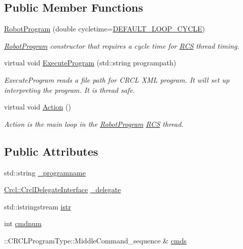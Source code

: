 \subsection*{Public Member Functions}
\begin{DoxyCompactItemize}
\item 
\hyperlink{classRCS_1_1RobotProgram_a9704d21c4a2d24fc856fad7af6e99903}{Robot\-Program} (double cycletime=\hyperlink{RCS_8h_a226eb3a426e9df46b88c4ba34f217203}{D\-E\-F\-A\-U\-L\-T\-\_\-\-L\-O\-O\-P\-\_\-\-C\-Y\-C\-L\-E})
\begin{DoxyCompactList}\small\item\em \hyperlink{classRCS_1_1RobotProgram}{Robot\-Program} constructor that requires a cycle time for \hyperlink{namespaceRCS}{R\-C\-S} thread timing. \end{DoxyCompactList}\item 
virtual void \hyperlink{classRCS_1_1RobotProgram_a0998f374dd54b6a0843d33a664c9da15}{Execute\-Program} (std\-::string programpath)
\begin{DoxyCompactList}\small\item\em Execute\-Program reads a file path for C\-R\-C\-L X\-M\-L program. It will set up interpreting the program. It is thread safe. \end{DoxyCompactList}\item 
virtual void \hyperlink{classRCS_1_1RobotProgram_a637f6305bb0beea4a9140b18b245790e}{Action} ()
\begin{DoxyCompactList}\small\item\em Action is the main loop in the \hyperlink{classRCS_1_1RobotProgram}{Robot\-Program} \hyperlink{namespaceRCS}{R\-C\-S} thread. \end{DoxyCompactList}\end{DoxyCompactItemize}
\subsection*{Public Attributes}
\begin{DoxyCompactItemize}
\item 
std\-::string \hyperlink{classRCS_1_1RobotProgram_aca7d780729e20c6d4e3988883b87527d}{\-\_\-programname}
\item 
\hyperlink{classCrcl_1_1CrclDelegateInterface}{Crcl\-::\-Crcl\-Delegate\-Interface} \hyperlink{classRCS_1_1RobotProgram_addf6e9d586d1fde1aa2b8105268d9e66}{\-\_\-delegate}
\item 
std\-::istringstream \hyperlink{classRCS_1_1RobotProgram_a0099964c452870619bd0ee7651ffb072}{istr}
\item 
int \hyperlink{classRCS_1_1RobotProgram_ad43243236b573d0e3fc39d4890a43373}{cmdnum}
\item 
\-::C\-R\-C\-L\-Program\-Type\-::\-Middle\-Command\-\_\-sequence \& \hyperlink{classRCS_1_1RobotProgram_ad6ed8ea72249e836521b2f7d7feb3523}{cmds}
\end{DoxyCompactItemize}
